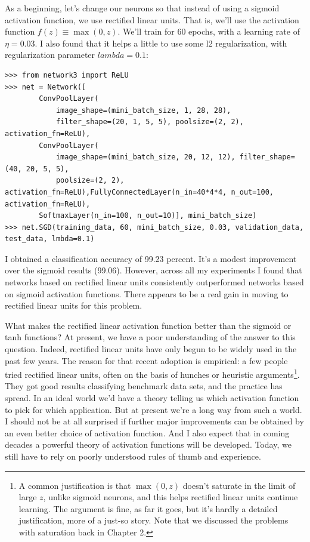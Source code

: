 \documentclass[a4paper,twoside,10pt]{book}
\begin{document}
As a beginning, let's change our neurons so that instead of using a sigmoid activation function, we use rectified linear units. That is, we'll use the activation function $f(z)\equiv\max(0,z)$. We'll train for 60 epochs, with a learning rate of $\eta=0.03$. I also found that it helps a little to use some l2 regularization, with regularization parameter $lambda=0.1$:
\begin{lstlisting}
>>> from network3 import ReLU
>>> net = Network([
		ConvPoolLayer(
			image_shape=(mini_batch_size, 1, 28, 28), 
			filter_shape=(20, 1, 5, 5), poolsize=(2, 2), activation_fn=ReLU),
		ConvPoolLayer(
			image_shape=(mini_batch_size, 20, 12, 12), filter_shape=(40, 20, 5, 5), 
			poolsize=(2, 2), activation_fn=ReLU),FullyConnectedLayer(n_in=40*4*4, n_out=100, activation_fn=ReLU),
		SoftmaxLayer(n_in=100, n_out=10)], mini_batch_size)
>>> net.SGD(training_data, 60, mini_batch_size, 0.03, validation_data, test_data, lmbda=0.1)

\end{lstlisting}
I obtained a classification accuracy of 99.23 percent. It's a modest improvement over the sigmoid results (99.06). However, across all my experiments I found that networks based on rectified linear units consistently outperformed networks based on sigmoid activation functions. There appears to be a real gain in moving to rectified linear units for this problem.

What makes the rectified linear activation function better than the sigmoid or tanh functions? At present, we have a poor understanding of the answer to this question. Indeed, rectified linear units have only begun to be widely used in the past few years. The reason for that recent adoption is empirical: a few people tried rectified linear units, often on the basis of hunches or heuristic arguments\footnote{A common justification is that $\max(0,z)$ doesn't saturate in the limit of large $z$, unlike sigmoid neurons, and this helps rectified linear units continue learning. The argument is fine, as far it goes, but it's hardly a detailed justification, more of a just-so story. Note that we discussed the problems with saturation back in Chapter 2.}. They got good results classifying benchmark data sets, and the practice has spread. In an ideal world we'd have a theory telling us which activation function to pick for which application. But at present we're a long way from such a world. I should not be at all surprised if further major improvements can be obtained by an even better choice of activation function. And I also expect that in coming decades a powerful theory of activation functions will be developed. Today, we still have to rely on poorly understood rules of thumb and experience.
\end{document}
